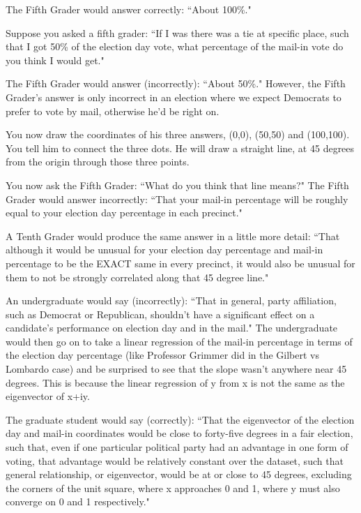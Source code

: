 The Fifth Grader would answer correctly: ``About 100\%."

Suppose you asked a fifth grader: ``If I was there was a tie at specific place, such that I got 50\% of the election day vote, what percentage of the mail-in vote do you think I would get."

The Fifth Grader would answer (incorrectly): ``About 50\%." However, the Fifth Grader's answer is only incorrect in an election where we expect Democrats to prefer to vote by mail, otherwise he'd be right on.

You now draw the coordinates of his three answers, (0,0), (50,50) and (100,100). You tell him to connect the three dots. He will draw a straight line, at 45 degrees from the origin through those three points.

You now ask the Fifth Grader: ``What do you think that line means?" The Fifth Grader would answer incorrectly: ``That your mail-in percentage will be roughly equal to your election day percentage in each precinct."

A Tenth Grader would produce the same answer in a little more detail: ``That although it would be unusual for your election day percentage and mail-in percentage to be the EXACT same in every precinct, it would also be unusual for them to not be strongly correlated along that 45 degree line."

An undergraduate would say (incorrectly): ``That in general, party affiliation, such as Democrat or Republican, shouldn't have a significant effect on a candidate's performance on election day and in the mail." The undergraduate would then go on to take a linear regression of the mail-in percentage in terms of the election day percentage (like Professor Grimmer did in the Gilbert vs Lombardo case) and be surprised to see that the slope wasn't anywhere near 45 degrees. This is because the linear regression of y from x is not the same as the eigenvector of x+iy.

The graduate student would say (correctly): ``That the eigenvector of the election day and mail-in coordinates would be close to forty-five degrees in a fair election, such that, even if one particular political party had an advantage in one form of voting, that advantage would be relatively constant over the dataset, such that general relationship, or eigenvector, would be at or close to 45 degrees, excluding the corners of the unit square, where x approaches 0 and 1, where y must also converge on 0 and 1 respectively."

